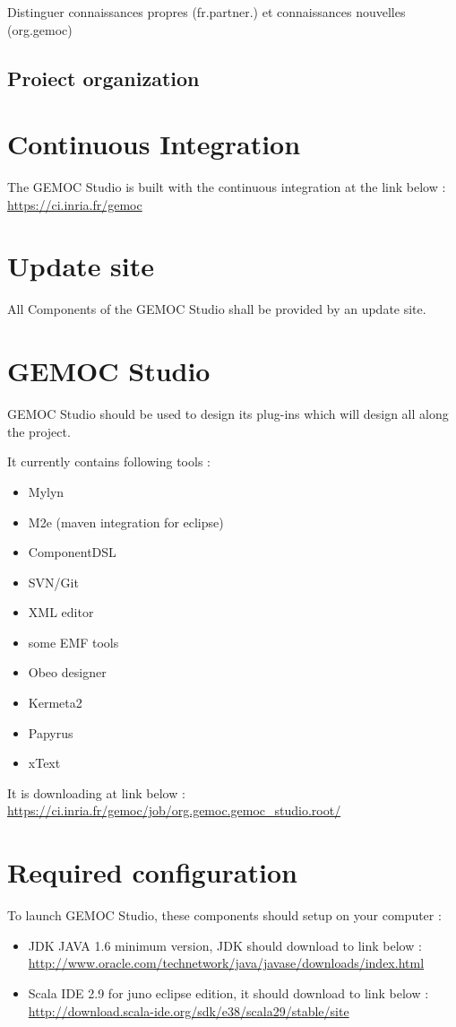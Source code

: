 \documentclass{gemoc} %
\begin{document}
Distinguer connaissances propres (fr.partner.) et connaissances nouvelles (org.gemoc)
\subsection{Proiect organization}
\section{Continuous Integration}
The GEMOC Studio is built with the continuous integration at the link below :
\newline\url{https://ci.inria.fr/gemoc} 
\section{Update site}
All Components of the GEMOC Studio shall be provided by an update site.
\section{GEMOC Studio}
GEMOC Studio should be used to design its plug-ins which will design all along the project.

It currently contains following tools :
\begin{itemize}
	\item Mylyn
	\item M2e (maven integration for eclipse)
	\item ComponentDSL
	\item SVN/Git
	\item XML editor
	\item some EMF tools
	\item Obeo designer
	\item Kermeta2
	\item Papyrus
	\item xText
\end{itemize}
It is downloading at link below :
\newline
\url {https://ci.inria.fr/gemoc/job/org.gemoc.gemoc_studio.root/}
\section{Required configuration}
To launch GEMOC Studio, these components should setup on your computer :
\begin{itemize}
	\item JDK JAVA 1.6 minimum version, JDK should download to link below :
	\newline
	\url {http://www.oracle.com/technetwork/java/javase/downloads/index.html}
	\item Scala IDE 2.9 for juno eclipse edition, it should download to link below :
	\newline
	\url {http://download.scala-ide.org/sdk/e38/scala29/stable/site}
\end{itemize}
\end{document}
